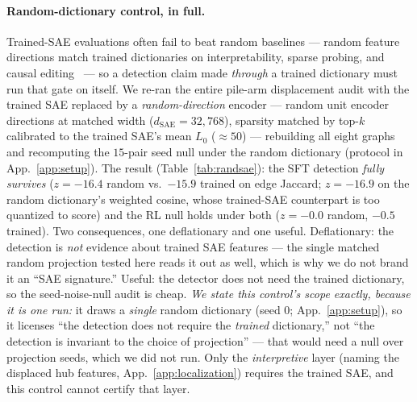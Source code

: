 \documentclass{article}
\begin{document}
\paragraph{Random-dictionary control, in full.} Trained-SAE evaluations often fail to beat random baselines --- random feature directions match trained dictionaries on interpretability, sparse probing, and causal editing~\citep{korznikov2026sanity} --- so a detection claim made \emph{through} a trained dictionary must run that gate on itself. We re-ran the entire pile-arm displacement audit with the trained SAE replaced by a \emph{random-direction} encoder --- random unit encoder directions at matched width ($d_{\text{SAE}}=32{,}768$), sparsity matched by top-$k$ calibrated to the trained SAE's mean $L_0$ ($\approx50$) --- rebuilding all eight graphs and recomputing the $15$-pair seed null under the random dictionary (protocol in App.~\ref{app:setup}). The result (Table~\ref{tab:randsae}): the SFT detection \emph{fully survives} ($z=-16.4$ random vs.\ $-15.9$ trained on edge Jaccard; $z=-16.9$ on the random dictionary's weighted cosine, whose trained-SAE counterpart is too quantized to score) and the RL null holds under both ($z=-0.0$ random, $-0.5$ trained). Two consequences, one deflationary and one useful. Deflationary: the detection is \emph{not} evidence about trained SAE features --- the single matched random projection tested here reads it out as well, which is why we do not brand it an ``SAE signature.'' Useful: the detector does not need the trained dictionary, so the seed-noise-null audit is cheap. \emph{We state this control's scope exactly, because it is one run:} it draws a \emph{single} random dictionary (seed $0$; App.~\ref{app:setup}), so it licenses ``the detection does not require the \emph{trained} dictionary,'' not ``the detection is invariant to the choice of projection'' --- that would need a null over projection seeds, which we did not run. Only the \emph{interpretive} layer (naming the displaced hub features, App.~\ref{app:localization}) requires the trained SAE, and this control cannot certify that layer.
\end{document}
